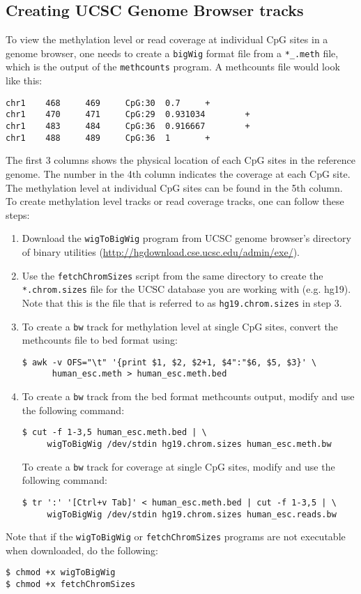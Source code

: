 \documentclass[10pt]{article}
\newcommand{\prog}[1]{\texttt{#1}}
\newcommand{\fn}[1]{\texttt{#1}}
\newcommand{\lit}[1]{\texttt{#1}}
\begin{document}
{{\subsection{Creating UCSC Genome Browser tracks}
\label{sec:browser}

To view the methylation level or read coverage at individual CpG sites
in a genome browser, one needs to create a \lit{bigWig} format file
from a \fn{*\_.meth} file, which is the output of the \prog{methcounts}
program. A methcounts file would look like this:

\begin{verbatim}
chr1    468     469     CpG:30  0.7     +
chr1    470     471     CpG:29  0.931034        +
chr1    483     484     CpG:36  0.916667        +
chr1    488     489     CpG:36  1       +
\end{verbatim}

The first 3 columns shows the physical location of each CpG sites in
the reference genome. The number in the 4th column indicates the
coverage at each CpG site. The methylation level at individual CpG
sites can be found in the 5th column. To create methylation level
tracks or read coverage tracks, one can follow these steps:

\begin{enumerate}
\item Download the \prog{wigToBigWig} program from UCSC genome
  browser's directory of binary utilities
  (\url{http://hgdownload.cse.ucsc.edu/admin/exe/}).
\item Use the \fn{fetchChromSizes} script from the same directory to
  create the \fn{*.chrom.sizes} file for the UCSC database you are
  working with (e.g. hg19). Note that this is the file that is
  referred to as \fn{hg19.chrom.sizes} in step 3.
\item To create a \fn{bw} track for methylation level at single CpG
  sites, convert the methcounts file to bed format using:
\begin{verbatim}
$ awk -v OFS="\t" '{print $1, $2, $2+1, $4":"$6, $5, $3}' \
      human_esc.meth > human_esc.meth.bed
\end{verbatim}
\item To create a \fn{bw} track from the bed format methcounts output,
modify and use the following command:
\begin{verbatim}
$ cut -f 1-3,5 human_esc.meth.bed | \
     wigToBigWig /dev/stdin hg19.chrom.sizes human_esc.meth.bw
\end{verbatim}
  To create a \fn{bw} track for coverage at single CpG sites, modify
  and use the following command:
\begin{verbatim}
$ tr ':' '[Ctrl+v Tab]' < human_esc.meth.bed | cut -f 1-3,5 | \
     wigToBigWig /dev/stdin hg19.chrom.sizes human_esc.reads.bw
\end{verbatim}
\end{enumerate}
Note that if the \prog{wigToBigWig} or \prog{fetchChromSizes} programs
are not executable when downloaded, do the following:
\begin{verbatim}
$ chmod +x wigToBigWig
$ chmod +x fetchChromSizes
\end{verbatim}

}}
\end{document}

